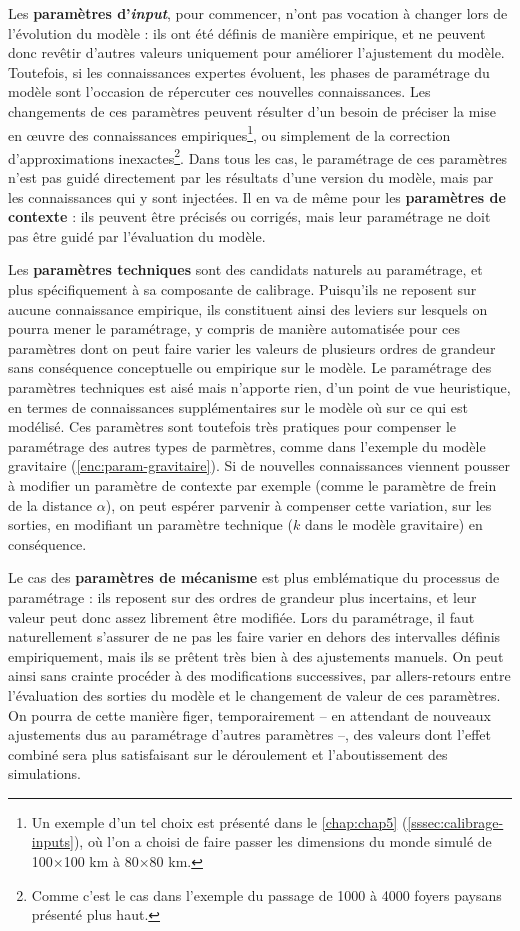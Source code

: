 Les \textbf{paramètres d'\textit{input}}, pour commencer, n'ont pas vocation à changer lors de l'évolution du modèle : ils ont été définis de manière empirique, et ne peuvent donc revêtir d'autres valeurs uniquement pour améliorer l'ajustement du modèle.
Toutefois, si les connaissances expertes évoluent, les phases de paramétrage du modèle sont l'occasion de répercuter ces nouvelles connaissances.
Les changements de ces paramètres peuvent résulter d'un besoin de préciser la mise en œuvre des connaissances empiriques\footnote{
	Un exemple d'un tel choix est présenté dans le \cref{chap:chap5} (\cref{sssec:calibrage-inputs}), où l'on a choisi de faire passer les dimensions du monde simulé de 100×100 km à 80×80 km.
}, ou simplement de la correction d'approximations inexactes\footnote{
	Comme c'est le cas dans l'exemple du passage de 1000 à 4000 foyers paysans présenté plus haut.
}.
Dans tous les cas, le paramétrage de ces paramètres n'est pas guidé directement par les résultats d'une version du modèle, mais par les connaissances qui y sont injectées.
Il en va de même pour les \textbf{paramètres de contexte} : ils peuvent être précisés ou corrigés, mais leur paramétrage ne doit pas être guidé par l'évaluation du modèle.

Les \textbf{paramètres techniques} sont des candidats naturels au paramétrage, et plus spécifiquement à sa composante de calibrage.
Puisqu'ils ne reposent sur aucune connaissance empirique, ils constituent ainsi des \og leviers\fg{} sur lesquels on pourra mener le paramétrage, y compris de manière automatisée pour ces paramètres dont on peut faire varier les valeurs de plusieurs ordres de grandeur sans conséquence conceptuelle ou empirique sur le modèle.
Le paramétrage des paramètres techniques est aisé mais n'apporte rien, d'un point de vue heuristique, en termes de connaissances supplémentaires sur le modèle où sur ce qui est modélisé.
Ces paramètres sont toutefois très \og pratiques\fg{} pour compenser le paramétrage des autres types de parmètres, comme dans l'exemple du modèle gravitaire (\cref{enc:param-gravitaire}).
Si de nouvelles connaissances viennent pousser à modifier un paramètre de contexte par exemple (comme le paramètre de frein de la distance $\alpha$), on peut espérer parvenir à compenser cette variation, sur les sorties, en modifiant un paramètre technique ($k$ dans le modèle gravitaire) en conséquence.

Le cas des \textbf{paramètres de mécanisme} est plus emblématique du processus de paramétrage : ils reposent sur des ordres de grandeur plus incertains, et leur valeur peut donc assez librement être modifiée.
Lors du paramétrage, il faut naturellement s'assurer de ne pas les faire varier en dehors des intervalles définis empiriquement, mais ils se prêtent très bien à des ajustements manuels.
On peut ainsi sans crainte procéder à des modifications successives, par allers-retours entre l'évaluation des sorties du modèle et le changement de valeur de ces paramètres.
On pourra de cette manière figer, temporairement -- en attendant de nouveaux ajustements dus au paramétrage d'autres paramètres --, des valeurs dont l'effet combiné sera plus satisfaisant sur le déroulement et l'aboutissement des simulations.

